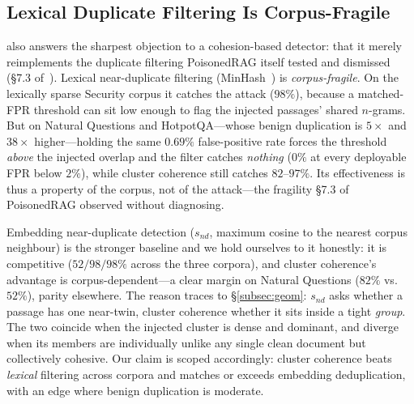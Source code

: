 \documentclass[conference]{IEEEtran}
\begin{document}
\subsection{Lexical Duplicate Filtering Is Corpus-Fragile}
\label{subsec:lex} also answers the sharpest objection to a cohesion-based detector: that
it merely reimplements the duplicate filtering PoisonedRAG itself tested and dismissed
(\S7.3 of~\cite{poisonedrag}). Lexical near-duplicate filtering (MinHash~\cite{minhash}) is \emph{corpus-fragile}. On the lexically
sparse Security corpus it catches the attack ($98\%$), because a matched-FPR threshold can sit
low enough to flag the injected passages' shared $n$-grams. But on Natural Questions and
HotpotQA---whose benign duplication is $5\times$ and $38\times$ higher---holding the same
$0.69\%$ false-positive rate forces the threshold \emph{above} the injected overlap and the
filter catches \emph{nothing} ($0\%$ at every deployable FPR below $2\%$), while cluster
coherence still catches $82$--$97\%$. Its effectiveness is thus a property of the corpus, not of
the attack---the fragility \S7.3 of PoisonedRAG observed without diagnosing.

Embedding near-duplicate detection ($s_{nd}$, maximum cosine to the nearest corpus neighbour) is
the stronger baseline and we hold ourselves to it honestly: it is competitive ($52/98/98\%$
across the three corpora), and cluster coherence's advantage is corpus-dependent---a clear
margin on Natural Questions ($82\%$ vs.\ $52\%$), parity elsewhere. The reason traces to
\S\ref{subsec:geom}: $s_{nd}$ asks whether a passage has one near-twin, cluster coherence
whether it sits inside a tight \emph{group}. The two coincide when the injected cluster is dense
and dominant, and diverge when its members are individually unlike any single clean document but
collectively cohesive. Our claim is scoped accordingly: cluster coherence beats \emph{lexical}
filtering across corpora and matches or exceeds embedding deduplication, with an edge where
benign duplication is moderate.
\end{document}
